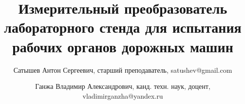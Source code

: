 \newcommand{\mainAuthor}{Сатышев Антон Сергеевич}
\newcommand{\articleTitle}{Измерительный преобразователь лабораторного стенда для испытания рабочих органов дорожных машин}
\newcommand{\keywords}{снежно-ледяные образования, дисковый режущий инструмент, силовые параметры, радиус закругления, лёд, радиус закругления рабой кромки}


\author{\mainAuthor, старший преподаватель, satushev@gmail.com}
\author{Ганжа Владимир Александрович, канд. техн. наук, доцент, vladimirganzha@yandex.ru}

\title{\articleTitle}
\date{}